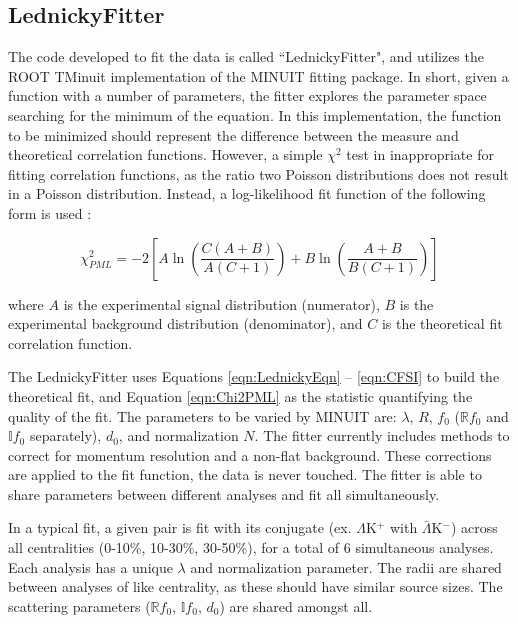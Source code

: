 \documentclass[../AnalysisNoteJBuxton.tex]{subfiles}
\begin{document}
\subsection{LednickyFitter}
\label{LednickyFitter}


The code developed to fit the data is called ``LednickyFitter", and utilizes the ROOT TMinuit implementation of the MINUIT fitting package.
In short, given a function with a number of parameters, the fitter explores the parameter space searching for the minimum of the equation.
In this implementation, the function to be minimized should represent the difference between the measure and theoretical correlation functions.
However, a simple $\chi^{2}$ test in inappropriate for fitting correlation functions, as the ratio two Poisson distributions does not result in a Poisson distribution.
Instead, a log-likelihood fit function of the following form is used \cite{Lisa:2005dd}:

\begin{equation}
 \chi^{2}_{PML} = -2\left[A\ln\left(\frac{C(A+B)}{A(C+1)}\right) + B\ln\left(\frac{A+B}{B(C+1)}\right)\right]
\label{eqn:Chi2PML}
\end{equation}

where $A$ is the experimental signal distribution (numerator), $B$ is the experimental background distribution (denominator), and $C$ is the theoretical fit correlation function.

The LednickyFitter uses Equations \ref{eqn:LednickyEqn} -- \ref{eqn:CFSI} to build the theoretical fit, and Equation \ref{eqn:Chi2PML} as the statistic quantifying the quality of the fit.
The parameters to be varied by MINUIT are: $\lambda$, $R$, $f_{0}$ ($\mathbb{R}f_{0}$ and $\mathbb{I}f_{0}$ separately), $d_{0}$, and normalization $N$.
The fitter currently includes methods to correct for momentum resolution and a non-flat background.
These corrections are applied to the fit function, the data is never touched.
The fitter is able to share parameters between different analyses and fit all simultaneously.  

In a typical fit, a given pair is fit with its conjugate (ex. $\Lambda$K$^{+}$ with $\bar{\Lambda}$K$^{-}$) across all centralities (0-10\%, 10-30\%, 30-50\%), for a total of 6 simultaneous analyses.
Each analysis has a unique $\lambda$ and normalization parameter.
The radii are shared between analyses of like centrality, as these should have similar source sizes.
The scattering parameters ($\mathbb{R}f_{0}$, $\mathbb{I}f_{0}$, $d_{0}$) are shared amongst all.
\end{document}
